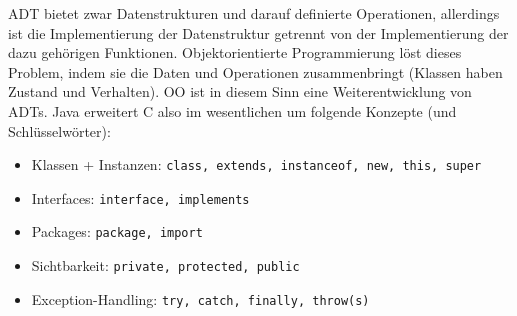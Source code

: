 ADT bietet zwar Datenstrukturen und darauf definierte Operationen, allerdings ist die Implementierung der Datenstruktur getrennt von der Implementierung der dazu gehörigen Funktionen. Objektorientierte Programmierung löst dieses Problem, indem sie die Daten und Operationen zusammenbringt (Klassen haben Zustand und Verhalten). OO ist in diesem Sinn eine Weiterentwicklung von ADTs. Java erweitert C also im wesentlichen um folgende
Konzepte (und Schlüsselwörter):

\begin{itemize}
	\item Klassen + Instanzen: \verb|class, extends, instanceof, new, this, super|
	\item Interfaces: \verb|interface, implements|
	\item Packages: \verb|package, import|
	\item Sichtbarkeit: \verb|private, protected, public|
	\item Exception-Handling: \verb|try, catch, finally, throw(s)|
\end{itemize}